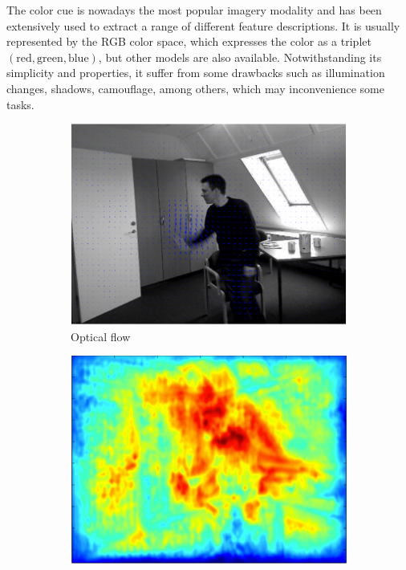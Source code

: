 \documentclass[10pt,twocolumn,letterpaper]{article}
\begin{document}
The color cue is nowadays the most popular imagery modality and has been extensively used to extract a range of different feature descriptions. It is usually represented by the RGB color space, which expresses the color as a triplet $(\text{red}, \text{green}, \text{blue})$, but other models are also available. Notwithstanding its simplicity and properties, it suffer from some drawbacks such as illumination changes, shadows, camouflage, among others, which may inconvenience some tasks.

\begin{figure}
        \begin{subfigure}[b]{0.515\textwidth}
                \includegraphics[width=\textwidth]{opticalflow_final.eps}
                \caption{Optical flow}
                \label{fig:opticalflow}
        \end{subfigure}
        \begin{subfigure}[b]{0.5\textwidth}
                \includegraphics[width=\textwidth]{ramanan_final}

\end{subfigure}
\end{figure}
\end{document}
